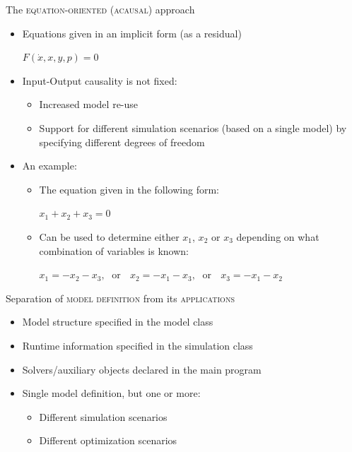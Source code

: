\documentclass[compress,newPxFont,sthlmFooter]{beamer}
\begin{document}
\begin{frame}{The \textsc{equation-oriented} (\textsc{acausal}) approach}
\begin{itemize}
  \item \alert{Equations given in an implicit form} (as a residual)
    \begin{center}
      $F(\dot {x}, x, y, p) = 0$
    \end{center}
  \item \alert{Input-Output causality} is \alert{not fixed}:
    \begin{itemize}
        \item Increased model re-use
        \item Support for \alert{different simulation scenarios} (based on a single model) by specifying different degrees of freedom
    \end{itemize}
  \item An example:
    \begin{itemize}
        \item The equation given in the following form:
            \begin{center}
                $x_1 + x_2 + x_3 = 0$
            \end{center}
        \item Can be used to determine either $x_1$, $x_2$ or $x_3$ depending on what combination of variables is known:
            \begin{center}
                $x_1 = -x_2 - x_3, \;$ \alert{or}  $\;$
                $x_2 = -x_1 - x_3, \;$ \alert{or}  $\;$
                $x_3 = -x_1 - x_2$
            \end{center}
    \end{itemize}
\end{itemize}
\end{frame}

\begin{frame}{Separation of \textsc{model definition} from its \textsc{applications}}
\begin{itemize}
  \item \alert{Model structure} specified in the \alert{model class}
  \item \alert{Runtime information} specified in the \alert{simulation class}
  \item \alert{Solvers/auxiliary objects} declared in the \alert{main program}
  \item \alert{Single model definition}, but \alert{one or more}:
  \begin{itemize}
    \item Different \alert{simulation scenarios}
    \item Different \alert{optimization scenarios}
  \end{itemize}
\end{itemize}
\end{frame}
\end{document}
